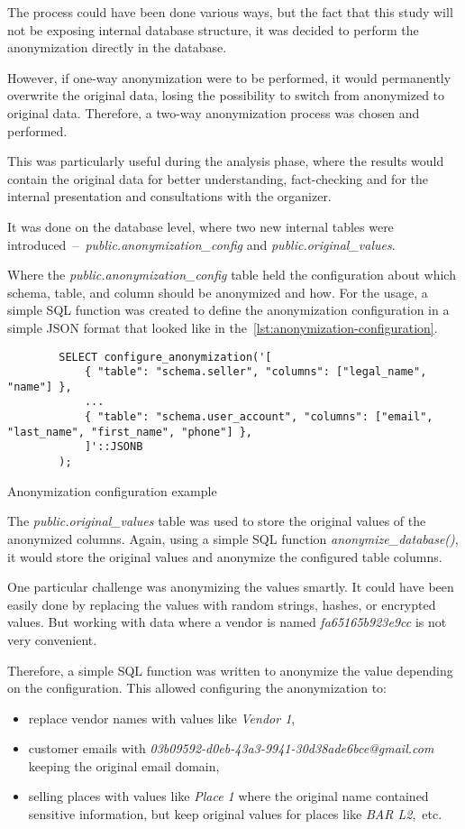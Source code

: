 The process could have been done various ways, but the fact that this study will not be exposing internal database structure, it was decided to perform the anonymization directly in the database.

However, if one-way anonymization were to be performed, it would permanently overwrite the original data, losing the possibility to switch from anonymized to original data.
Therefore, a two-way anonymization process was chosen and performed.

This was particularly useful during the analysis phase, where the results would contain the original data for better understanding, fact-checking and for the internal presentation and consultations with the organizer.

It was done on the database level, where two new internal tables were introduced~–~\textit{public.anonymization\_config} and \textit{public.original\_values}.

Where the \textit{public.anonymization\_config} table held the configuration about which schema, table, and column should be anonymized and how.
For the usage, a simple SQL function was created to define the anonymization configuration in a simple JSON format that looked like in the~\autoref{lst:anonymization-configuration}.

\begin{listing}[h]
	\begin{verbatim}
		SELECT configure_anonymization('[
			{ "table": "schema.seller", "columns": ["legal_name", "name"] },
			...
			{ "table": "schema.user_account", "columns": ["email", "last_name", "first_name", "phone"] },
			]'::JSONB
		);
	\end{verbatim}
	\caption{Anonymization configuration example}
	\label{lst:anonymization-configuration}
\end{listing}

The \textit{public.original\_values} table was used to store the original values of the anonymized columns.
Again, using a simple SQL function \textit{anonymize\_database()}, it would store the original values and anonymize the configured table columns.

One particular challenge was anonymizing the values smartly.
It could have been easily done by replacing the values with random strings, hashes, or encrypted values.
But working with data where a vendor is named \textit{fa65165b923e9cc} is not very convenient.

Therefore, a simple SQL function was written to anonymize the value depending on the configuration.
This allowed configuring the anonymization to:
\begin{itemize}
	\item replace vendor names with values like \textit{Vendor 1},
	\item customer emails with \textit{03b09592-d0eb-43a3-9941-30d38ade6bce@gmail.com} keeping the original email domain,
	\item selling places with values like \textit{Place 1} where the original name contained sensitive information, but keep original values for places like \textit{BAR L2},~etc.
\end{itemize}

